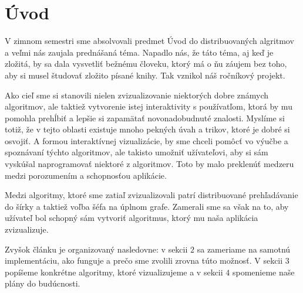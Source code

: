 \section{Úvod}

V zimnom semestri sme absolvovali predmet Úvod do distribuovaných algritmov a veľmi nás zaujala
prednášaná téma. Napadlo nás, že táto téma, aj keď je zložitá, by sa dala vysvetliť bežnému človeku,
ktorý má o ňu záujem bez toho, aby si musel študovať zložito písané knihy. Tak vznikol náš ročníkový
projekt.

Ako cieľ sme si stanovili nielen zvizualizovanie niektorých dobre známych algoritmov, ale taktiež
vytvorenie istej interaktivity s používatľom, ktorá by mu pomohla prehĺbiť a lepšie si zapamätať
novonadobudnuté znalosti. Myslíme si totiž, že v tejto oblasti existuje mnoho pekných úvah a trikov,
ktoré je dobré si osvojiť. A formou interaktívnej vizualizácie, by sme chceli pomôcť vo
výučbe a spoznávaní týchto algoritmov, ale takisto umožniť užívateľovi, aby si sám vyskúšal
naprogramovať niektoré z algoritmov. Toto by malo preklenúť medzeru medzi porozumením a schopnosťou
aplikácie.

Medzi algoritmy, ktoré sme zatiaľ zvizualizovali patrí distribuované prehľadávanie do šírky a
taktiež voľba šéfa na úplnom grafe. Zamerali sme sa však na to, aby užívateľ bol schopný sám
vytvoriť algoritmus, ktorý mu naša aplikácia zvizualizuje.

Zvyšok článku je organizovaný nasledovne: v sekcii $2$ sa zameriame na samotnú implementáciu, ako
funguje a prečo sme zvolili zrovna túto možnosť. V sekcii $3$ popíšeme konkrétne algoritmy, ktoré
vizualizujeme a v sekcii $4$ spomenieme naše plány do budúcnosti.
